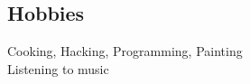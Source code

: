 \documentclass[a4paper,10pt]{article}
\begin{document}
\begin{adjustbox}{valign=t}
\begin{minipage}{0.6\textwidth}
\begin{multicols}{2}
\vfill\null \columnbreak  %

\section*{Hobbies}

Cooking, Hacking, Programming, Painting\\
Listening to music

\vfill\null  %

\end{multicols}
\LastUpdate
\end{minipage}
\end{adjustbox}
\end{document}
